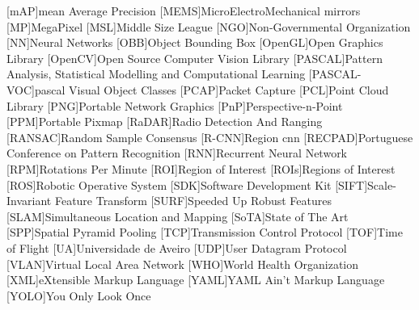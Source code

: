 \begin{multicols}{2}
\begin{acronym}[AAAAAA]
	[mAP]{mean Average Precision}
	[MEMS]{MicroElectroMechanical mirrors}
	[MP]{MegaPixel}
	[MSL]{Middle Size League}
	[NGO]{Non-Governmental Organization} 
	[NN]{Neural Networks}
	[OBB]{Object Bounding Box}
	[OpenGL]{Open Graphics Library}
	[OpenCV]{Open Source Computer Vision Library}
	[PASCAL]{Pattern Analysis, Statistical Modelling and Computational Learning} 
	[PASCAL-VOC]{\acl{pascal} Visual Object Classes}
	[PCAP]{Packet Capture}
	[PCL]{Point Cloud Library}
	[PNG]{Portable Network Graphics}
	[PnP]{Perspective-n-Point}
	[PPM]{Portable Pixmap}
	[RaDAR]{Radio Detection And Ranging}
	[RANSAC]{Random Sample Consensus}
	[R-CNN]{Region \acl{cnn}}
	[RECPAD]{Portuguese Conference on Pattern Recognition}
	[RNN]{Recurrent Neural Network}
	[RPM]{Rotations Per Minute}
	[ROI]{Region of Interest}
	[ROIs]{Regions of Interest}
	[ROS]{Robotic Operative System}
	[SDK]{Software Development Kit}
	[SIFT]{Scale-Invariant Feature Transform}
	[SURF]{Speeded Up Robust Features}
	[SLAM]{Simultaneous Location and Mapping} 
	[SoTA]{State of The Art}
	[SPP]{Spatial Pyramid Pooling}
	[TCP]{Transmission Control Protocol}
	[TOF]{Time of Flight} 
	[UA]{Universidade de Aveiro}
	[UDP]{User Datagram Protocol}
	[VLAN]{Virtual Local Area Network}
	[WHO]{World Health Organization}
	[XML]{eXtensible Markup Language}
	[YAML]{YAML Ain't Markup Language}
	[YOLO]{You Only Look Once}
\end{acronym}
\end{multicols}

